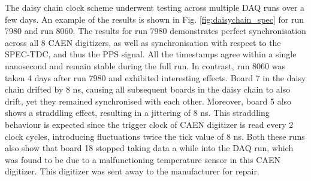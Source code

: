 The daisy chain clock scheme underwent testing across multiple DAQ runs over a few days. 
An example of the results is shown in Fig. \ref{fig:daisychain_spec} for run 7980 and run 8060.
The results for run 7980 demonstrates perfect synchronisation across all 8 CAEN digitizers, as well as synchronisation with respect to the SPEC-TDC, and thus the PPS signal.
All the timestamps agree within a single nanosecond and remain stable during the full run.
In contrast, run 8060 was taken 4 days after run 7980 and exhibited interesting effects.
Board 7 in the daisy chain drifted by 8 ns, causing all subsequent boards in the daisy chain to also drift, yet they remained synchronised with each other. 
Moreover, board 5 also shows a straddling effect, resulting in a jittering of 8 ns.
This straddling behaviour is expected since the trigger clock of CAEN digitizer is read every 2 clock cycles, introducing fluctuations twice the tick value of 8 ns.
Both these runs also show that board 18 stopped taking data a while into the DAQ run, which was found to be due to a malfunctioning temperature sensor in this CAEN digitizer.
This digitizer was sent away to the manufacturer for repair.

